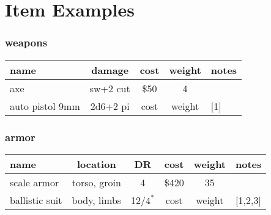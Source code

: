 \documentclass[a4paper,10pt]{book}
\begin{document}
\section{Item Examples}

\subsubsection{weapons}
\begin{tabu}{l c c c l}
  \rowfont{\bfseries\itshape}
  name               & damage     & cost     & weight & notes \\
  \hline
  axe                & sw+2 cut   & \${}50   & 4      &       \\
  auto pistol 9mm    & 2d6+2 pi   & cost     & weight & [1]   \\
\end{tabu}

\subsubsection{armor}
\begin{tabu}{l c c c c l}
  \rowfont{\bfseries\itshape}
  name               & location     & DR       & cost     & weight & notes   \\
  \hline
  scale armor        & torso, groin & 4        & \${}420  & 35     &         \\
  ballistic suit     & body, limbs  & 12/$4^*$ & cost     & weight & [1,2,3] \\
\end{tabu}



\end{document}
